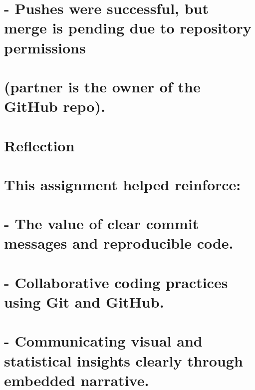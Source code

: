 \documentclass[
]{article}
\begin{document}
\section{- Pushes were successful, but merge is pending due to
repository
permissions}\label{pushes-were-successful-but-merge-is-pending-due-to-repository-permissions}

\section{(partner is the owner of the GitHub
repo).}\label{partner-is-the-owner-of-the-github-repo.}

\section{Reflection}\label{reflection}

\section{This assignment helped
reinforce:}\label{this-assignment-helped-reinforce}

\section{- The value of clear commit messages and reproducible
code.}\label{the-value-of-clear-commit-messages-and-reproducible-code.}

\section{- Collaborative coding practices using Git and
GitHub.}\label{collaborative-coding-practices-using-git-and-github.}

\section{- Communicating visual and statistical insights clearly through
embedded
narrative.}\label{communicating-visual-and-statistical-insights-clearly-through-embedded-narrative.}
\end{document}
